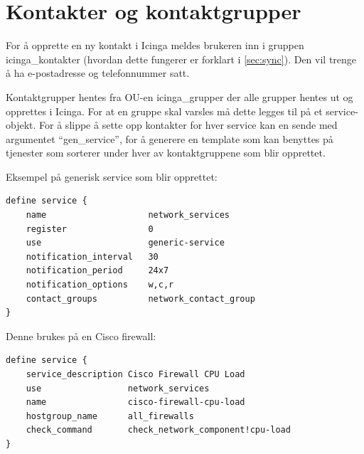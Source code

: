 	\section{Kontakter og kontaktgrupper}
For å opprette en ny kontakt i Icinga meldes brukeren inn i gruppen icinga\_kontakter (hvordan dette fungerer er forklart i \ref{sec:sync}). Den vil trenge å ha e-postadresse og telefonnummer satt.

Kontaktgrupper hentes fra OU-en icinga\_grupper der alle grupper hentes ut og opprettes i Icinga. For at en gruppe skal varsles må dette legges til på et service-objekt. For å slippe å sette opp kontakter for hver service kan en sende med argumentet ``gen\_service'', for å generere en template som kan benyttes på tjenester som sorterer under hver av kontaktgruppene som blir opprettet.

Eksempel på generisk service som blir opprettet:
\begin{lstlisting}[style=example]
define service {
    name 				    network_services
    register 		   		0
    use 			   		generic-service     
    notification_interval   30
    notification_period     24x7
    notification_options    w,c,r
    contact_groups          network_contact_group
}
\end{lstlisting}

Denne brukes på en Cisco firewall: 
\begin{lstlisting}[style=example]
define service {
    service_description Cisco Firewall CPU Load
    use 				network_services
    name 				cisco-firewall-cpu-load
    hostgroup_name 		all_firewalls
    check_command 		check_network_component!cpu-load
}
\end{lstlisting}

